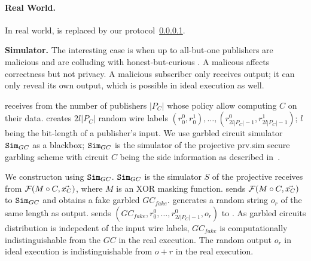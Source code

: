 \paragraph{Real World.} In real world, \F is replaced by our protocol~\ref{}.

\noindent\textbf{Simulator.}
%
%
%
%
%
%
%
The interesting case is when up to all-but-one publishers are malicious and are
colluding with honest-but-curious \broker. A malicous \broker affects
correctness but not privacy. A malicious subscriber only receives output; it
can only reveal its own output, which is possible in ideal execution as well.

\Sim receives from \F the number of publishers $|P_C|$ whose policy allow
computing $C$ on their data. \Sim creates $2l|P_C|$ random wire labels $(r_0^0,
r_0^1), \ldots, (r_{2l|P_C|-1}^0 ,r_{2l|P_C|-1}^1)$; $l$ being the bit-length
of a publisher's input. We use garbled circuit simulator $\texttt{Sim}_{GC}$ as a
blackbox; $\texttt{Sim}_{GC}$ is the simulator of the projective prv.sim secure
garbling scheme with circuit $C$ being the side information as described
in~\cite{}. 

We constructon \Sim using $\texttt{Sim}_{GC}$. $\texttt{Sim}_{GC}$ is the simulator $S$ of the
projective \Sim receives from \F $\mathcal{F}(M \circ C, \vec{x_C})$, where $M$ is an
XOR masking function. \Sim sends $\mathcal{F}(M \circ C, \vec{x_C})$ to $\texttt{Sim}_{GC}$ and
obtains a fake garbled $GC_{fake}$. \Sim generates a random string $o_r$ of the
same length as output. \Sim sends $(GC_{fake}, r_0^0, \ldots, r_{2l|P_C|-1}^0,
o_r)$ to \Adv. As garbled circuits distribution is indepedent of the input wire
labels, $GC_{fake}$ is computationally indistinguishable from the $GC$ in the
real execution. The random output $o_r$ in ideal execution is indistinguishable
from $o+r$ in the real execution.

